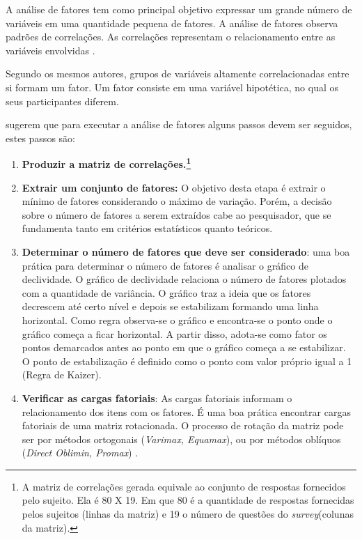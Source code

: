 A análise de fatores tem como principal objetivo expressar um grande número de variáveis em uma quantidade pequena de fatores. A análise de fatores observa padrões de correlações. As correlações representam o relacionamento entre as variáveis envolvidas \cite{dancey}. 

Segundo os mesmos autores, grupos de variáveis altamente correlacionadas entre si formam um fator. Um fator consiste em uma variável hipotética, no qual os seus participantes diferem.

 sugerem que para executar a análise de fatores alguns passos devem ser seguidos, estes passos são:

\begin{enumerate}
\item \textbf{Produzir a matriz de correlações.\footnote{A matriz de correlações gerada equivale ao conjunto de respostas fornecidos pelo sujeito. Ela é 80 X 19. Em que 80 é a quantidade de respostas fornecidas pelos sujeitos (linhas da matriz) e 19  o número de questões do \textit{survey}(colunas da matriz).}}

\item \textbf{Extrair um conjunto de fatores:} O objetivo desta etapa é extrair o mínimo de fatores considerando o máximo de variação. Porém, a decisão sobre o número de fatores a serem extraídos cabe ao pesquisador, que se fundamenta tanto em critérios estatísticos quanto teóricos.

\item \textbf{Determinar o número de fatores que deve ser considerado}: uma boa prática para determinar o número de fatores é analisar o gráfico de declividade. O gráfico de declividade relaciona o número de fatores plotados com a quantidade de variância. O gráfico traz a ideia que os fatores decrescem até certo nível e depois se estabilizam formando uma linha horizontal. Como regra observa-se o gráfico e encontra-se o ponto onde o gráfico começa a ficar horizontal. A partir disso, adota-se como fator os pontos demarcados antes ao ponto em que o gráfico começa a se estabilizar. O ponto de estabilização é definido como o ponto com valor próprio igual a 1 (Regra de Kaizer)\cite{maroco2013}.  

\item\textbf{ Verificar as cargas fatoriais}: As cargas fatoriais informam o relacionamento dos itens com os fatores. É uma boa prática encontrar cargas fatoriais de uma matriz rotacionada. O processo de rotação da matriz pode ser por métodos ortogonais (\textit{Varimax, Equamax}), ou por métodos oblíquos (\textit{Direct Oblimin, Promax}) \cite{maroco2013}. 



\end{enumerate}
